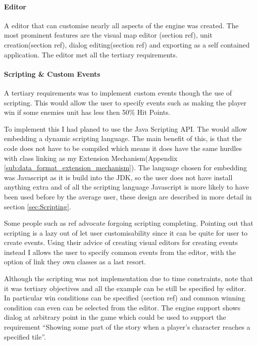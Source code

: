 \paragraph{Editor\\}
A editor that can customise nearly all aspects of the engine was created.  The most prominent features are the visual map editor (section ref), unit creation(section ref), dialog editing(section ref) and exporting as a self contained application.  The editor met all the  tertiary requirements.

\paragraph{Scripting \& Custom Events\\}
A tertiary requirements was to implement custom events though the use of scripting.  This would allow the user to specify events such as making the player win if some enemies unit has less then 50\% Hit Points. 

To implement this I had planed to use the Java Scripting API\cite{javas}. The would allow embedding a dynamic scripting language.  The main benefit of this, is that the code does not have to be compiled which means it does have the same hurdles with class linking as my Extension Mechanism(Appendix \ref{sub:data_format_extension_mechanism}).   The language chosen for embedding was Javascript  as it is build into the JDK, so the user does not have install anything extra and of all the scripting language Javascript  is more likely to have been used before by the average user, these design are described in more detail in section \ref{sec:Scripting}. 

Some people such as ref  advocate forgoing scripting completing. Pointing out that scripting is a lazy out of let user customisability since it can be quite for user to create events.  Using their advice of creating visual editors for creating events instead I allows the user to specify common events from the editor, with the option of link they own classes as a last resort. 

Although the scripting was not implementation due to time constraints, note that it was  tertiary objectives and all the example can be still be specified by editor. In particular win conditions can be specified (section ref) and common winning condition can even can be selected from the editor.  The engine support shows dialog at arbitrary point in the game which could be used to support the requirement ``Showing some part of the story when a player’s character reaches a specified tile''.

